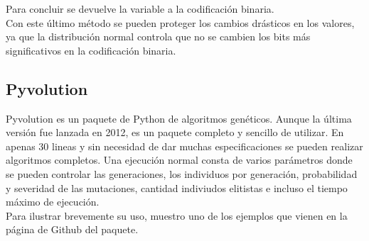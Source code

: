 \documentclass[12pt,a4paper]{article}
\begin{document}
			Para concluir se devuelve la variable a la codificaci\'on binaria.\\
			
			Con este \'ultimo m\'etodo se pueden proteger los cambios dr\'asticos en los valores, ya que la distribuci\'on normal controla que no se cambien los bits m\'as significativos en la codificaci\'on binaria.\\
							
		\subsection{Pyvolution}
		
		Pyvolution es un paquete de Python de algoritmos gen\'eticos. Aunque la \'ultima versi\'on fue lanzada en 2012, es un paquete completo y sencillo de utilizar. En apenas 30 lineas y sin necesidad de dar muchas especificaciones se pueden realizar algoritmos completos. Una ejecuci\'on normal consta de varios par\'ametros donde se pueden controlar las generaciones, los individuos por generaci\'on, probabilidad y severidad de las mutaciones, cantidad indiviudos elitistas e incluso el tiempo m\'aximo de ejecuci\'on.\\
		
		Para ilustrar brevemente su uso, muestro uno de los ejemplos que vienen en la p\'agina de Github del paquete.
		
\end{document}
